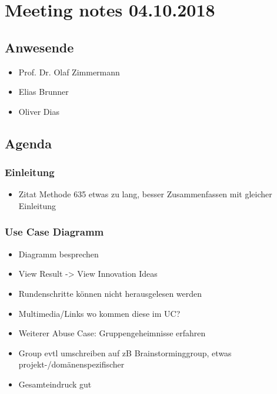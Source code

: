 \hypertarget{meeting-notes-04.10.2018}{%
\section*{Meeting notes 04.10.2018}\label{meeting-notes-04.10.2018}}

\hypertarget{anwesende}{%
\subsection*{Anwesende}\label{anwesende}}

\begin{itemize}

\item
  Prof. Dr. Olaf Zimmermann
\item
  Elias Brunner
\item
  Oliver Dias
\end{itemize}

\hypertarget{agenda}{%
\subsection*{Agenda}\label{agenda}}

\hypertarget{einleitung}{%
\subsubsection*{Einleitung}\label{einleitung}}

\begin{itemize}

\item
  Zitat Methode 635 etwas zu lang, besser Zusammenfassen mit gleicher
  Einleitung
\end{itemize}

\hypertarget{use-case-diagramm}{%
\subsubsection*{Use Case Diagramm}\label{use-case-diagramm}}

\begin{itemize}
\item
  Diagramm besprechen
\item
  View Result -\textgreater{} View Innovation Ideas
\item
  Rundenschritte können nicht herausgelesen werden
\item
  Multimedia/Links wo kommen diese im UC?
\item
  Weiterer Abuse Case: Gruppengeheimnisse erfahren
\item
  Group evtl umschreiben auf zB Brainstorminggroup, etwas
  projekt-/domänenspezifischer
\item
  Gesamteindruck gut
\end{itemize}

